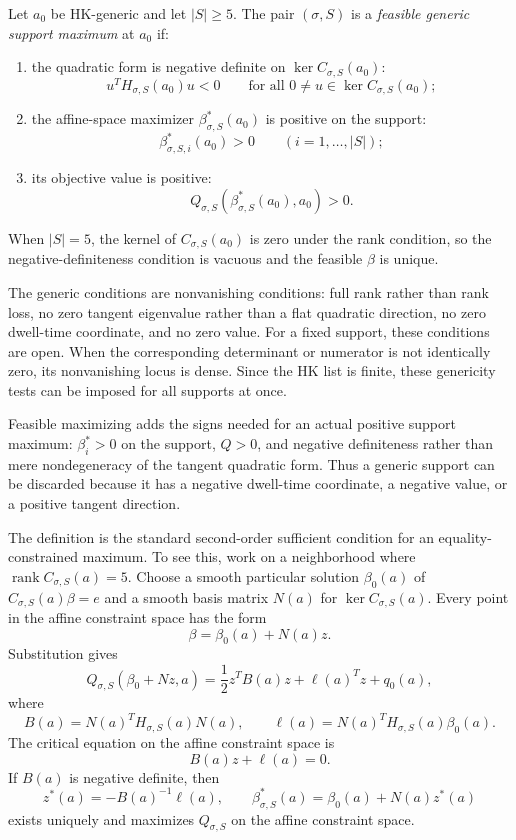 \begin{unverified}
\begin{definition}
\label{def:feasible-generic-support-maximum}
Let \(a_0\) be HK-generic and let \(|S|\geq 5\). The pair \((\sigma,S)\) is a
\emph{feasible generic support maximum} at \(a_0\) if:
\begin{enumerate}
\item the quadratic form is negative definite on \(\ker C_{\sigma,S}(a_0)\):
  \[
    u^T H_{\sigma,S}(a_0)u < 0
    \qquad
    \text{for all }0\neq u\in \ker C_{\sigma,S}(a_0);
  \]
\item the affine-space maximizer \(\beta^*_{\sigma,S}(a_0)\) is positive on
  the support:
  \[
    \beta^*_{\sigma,S,i}(a_0)>0
    \qquad (i=1,\ldots,|S|);
  \]
\item its objective value is positive:
  \[
    Q_{\sigma,S}(\beta^*_{\sigma,S}(a_0),a_0)>0.
  \]
\end{enumerate}
When \(|S|=5\), the kernel of \(C_{\sigma,S}(a_0)\) is zero under the rank
condition, so the negative-definiteness condition is vacuous and the feasible
\(\beta\) is unique.
\end{definition}

\begin{remark}
\label{rem:generic-versus-feasible-maximizing}
The generic conditions are nonvanishing conditions: full rank rather than rank
loss, no zero tangent eigenvalue rather than a flat quadratic direction, no zero
dwell-time coordinate, and no zero value. For a fixed support, these conditions
are open. When the corresponding determinant or numerator is not identically
zero, its nonvanishing locus is dense. Since the HK list is finite, these
genericity tests can be imposed for all supports at once.

Feasible maximizing adds the signs needed for an actual positive support
maximum: \(\beta^*_i>0\) on the support, \(Q>0\), and negative definiteness
rather than mere nondegeneracy of the tangent quadratic form. Thus a generic
support can be discarded because it has a negative dwell-time coordinate, a
negative value, or a positive tangent direction.
\end{remark}

The definition is the standard second-order sufficient condition for an
equality-constrained maximum. To see this, work on a neighborhood where
\(\operatorname{rank} C_{\sigma,S}(a)=5\). Choose a smooth particular solution
\(\beta_0(a)\) of \(C_{\sigma,S}(a)\beta=e\) and a smooth basis matrix
\(N(a)\) for \(\ker C_{\sigma,S}(a)\). Every point in the affine constraint
space has the form
\[
  \beta = \beta_0(a)+N(a)z.
\]
Substitution gives
\[
  Q_{\sigma,S}(\beta_0+Nz,a)
    = \frac12 z^T B(a)z + \ell(a)^Tz + q_0(a),
\]
where
\[
  B(a)=N(a)^T H_{\sigma,S}(a)N(a),
  \qquad
  \ell(a)=N(a)^T H_{\sigma,S}(a)\beta_0(a).
\]
The critical equation on the affine constraint space is
\[
  B(a)z+\ell(a)=0.
\]
If \(B(a)\) is negative definite, then
\[
  z^*(a)=-B(a)^{-1}\ell(a),
  \qquad
  \beta^*_{\sigma,S}(a)=\beta_0(a)+N(a)z^*(a)
\]
exists uniquely and maximizes \(Q_{\sigma,S}\) on the affine constraint space.


\end{unverified}
